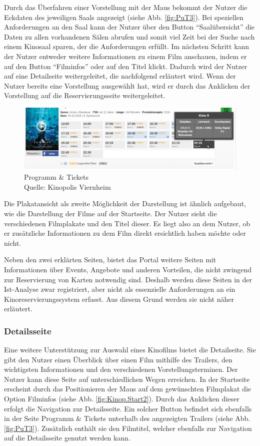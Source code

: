	Durch das Überfahren einer Vorstellung mit der Maus bekommt der Nutzer die Eckdaten des jeweiligen Saals angezeigt (siehe Abb. \vref{fig:PuT3}). Bei speziellen Anforderungen an den Saal kann der Nutzer über den Button \enquote{Saalübersicht} die Daten zu allen vorhandenen Sälen abrufen und somit viel Zeit bei der Suche nach einem Kinosaal sparen, der die Anforderungen erfüllt. Im nächsten Schritt kann der Nutzer entweder weitere Informationen zu einem Film anschauen, indem er auf den Button \enquote{Filminfos} oder auf den Titel klickt. Dadurch wird der Nutzer auf eine Detailseite weitergeleitet, die nachfolgend erläutert wird. Wenn der Nutzer bereits eine Vorstellung ausgewählt hat, wird er durch das Anklicken der Vorstellung auf die Reservierungsseite weitergeleitet. 
	\begin{figure}[H]
		\centering 
		\includegraphics[width=14cm]{img/PuT_3.png}
		\captionsetup{format=hang}
		\centering\caption[Programm \& Tickets]{\label{fig:PuT3}Programm \& Tickets \\Quelle: Kinopolis Viernheim}
	\end{figure}
	
	Die Plakatansicht als zweite Möglichkeit der Darstellung ist ähnlich aufgebaut, wie die Darstellung der Filme auf der Startseite. Der Nutzer sieht die verschiedenen Filmplakate und den Titel dieser. Es liegt also an dem Nutzer, ob er zusätzliche Informationen zu dem Film direkt ersichtlich haben möchte oder nicht.  
	
	Neben den zwei erklärten Seiten, bietet das Portal weitere Seiten mit Informationen über Events, Angebote und anderen Vorteilen, die nicht zwingend zur Reservierung von Karten notwendig sind. Deshalb werden diese Seiten in der Ist-Analyse zwar registriert, aber nicht als essenzielle Anforderungen an ein Kinoreservierungssystem erfasst. Aus diesem Grund werden sie nicht näher erläutert.
	
	\subsubsection{Detailsseite}
	Eine weitere Unterstützung zur Auswahl eines Kinofilms bietet die Detailseite. Sie gibt den Nutzer einen Überblick über einen Film mithilfe des Trailers, den wichtigsten Informationen und den verschiedenen Vorstellungsterminen. Der Nutzer kann diese Seite auf unterschiedlichen Wegen erreichen. In der Startseite erscheint durch das Positionieren der Maus auf dem gewünschten Filmplakat die Option Filminfos (siehe Abb. \vref{fig:Kinop.Start2}). Durch das Anklicken dieser erfolgt die Navigation zur Detailsseite. Ein solcher Button befindet sich ebenfalls in der Seite Programm \& Tickets unterhalb des angezeigten Trailers (siehe Abb. \vref{fig:PuT3}). Zusätzlich enthält sie den Filmtitel, welcher ebenfalls zur Navigation auf die Detailsseite genutzt werden kann. 
	
